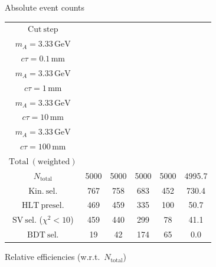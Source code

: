 \documentclass[10pt,a4paper]{article}
\renewcommand{\arraystretch}{1.4}
\begin{document}
{\footnotesize\setlength{\tabcolsep}{4pt}\renewcommand{\arraystretch}{1.05}%
\vspace{12pt}

Absolute event counts

\begin{tabular}{cccccc}
\toprule
$\mathrm{Cut\ step}$ & \shortstack{$m_{\pi}=10\,\mathrm{GeV}$\\$m_{A}=3.33\,\mathrm{GeV}$\\$c\tau=0.1\,\mathrm{mm}$} & \shortstack{$m_{\pi}=10\,\mathrm{GeV}$\\$m_{A}=3.33\,\mathrm{GeV}$\\$c\tau=1\,\mathrm{mm}$} & \shortstack{$m_{\pi}=10\,\mathrm{GeV}$\\$m_{A}=3.33\,\mathrm{GeV}$\\$c\tau=10\,\mathrm{mm}$} & \shortstack{$m_{\pi}=10\,\mathrm{GeV}$\\$m_{A}=3.33\,\mathrm{GeV}$\\$c\tau=100\,\mathrm{mm}$} & \shortstack{$\mathrm{QCD}$\\$\mathrm{Total\ (weighted)}$} \\
\midrule
$N_{\mathrm{total}}$ & 5000 & 5000 & 5000 & 5000 & 4995.7\\
$\mathrm{Kin.\ sel.}$ & 767 & 758 & 683 & 452 & 730.4\\
$\mathrm{HLT\ presel.}$ & 469 & 459 & 335 & 100 & 50.7\\
$\mathrm{SV\ sel.}$ ($\chi^2{<}10$) & 459 & 440 & 299 & 78 & 41.1\\
$\mathrm{BDT\ sel.}$ & 19 & 42 & 174 & 65 & 0.0\\
\bottomrule
\end{tabular}

\vspace{18pt}

Relative efficiencies (w.r.t.\ $N_{\mathrm{total}}$)

}
\end{document}
